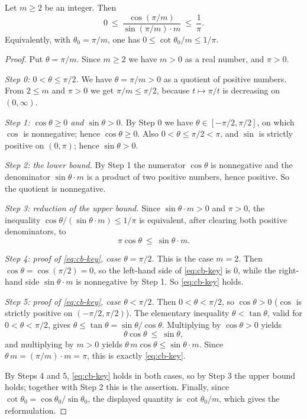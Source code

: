 \begin{lemma}
Let $m\ge2$ be an integer. Then
\[
  0\ \le\ \frac{\cos(\pi/m)}{\sin(\pi/m)\cdot m}\ \le\ \frac1\pi .
\]
Equivalently, with $\theta_0=\pi/m$, one has $0\le\cot\theta_0/m\le1/\pi$.
\end{lemma}
\begin{proof}
Put $\theta=\pi/m$. Since $m\ge2$ we have $m>0$ as a real number, and $\pi>0$.

\emph{Step 0: $0<\theta\le\pi/2$.} We have $\theta=\pi/m>0$ as a quotient of
positive numbers. From $2\le m$ and $\pi>0$ we get $\pi/m\le\pi/2$, because
$t\mapsto\pi/t$ is decreasing on $(0,\infty)$.

\emph{Step 1: $\cos\theta\ge0$ and $\sin\theta>0$.} By Step 0 we have
$\theta\in[-\pi/2,\pi/2]$, on which $\cos$ is nonnegative; hence
$\cos\theta\ge0$. Also $0<\theta\le\pi/2<\pi$, and $\sin$ is strictly positive
on $(0,\pi)$; hence $\sin\theta>0$.

\emph{Step 2: the lower bound.} By Step 1 the numerator $\cos\theta$ is
nonnegative and the denominator $\sin\theta\cdot m$ is a product of two positive
numbers, hence positive. So the quotient is nonnegative.

\emph{Step 3: reduction of the upper bound.} Since $\sin\theta\cdot m>0$ and
$\pi>0$, the inequality $\cos\theta/(\sin\theta\cdot m)\le1/\pi$ is equivalent,
after clearing both positive denominators, to
\begin{equation}\label{eq:cb-key}
  \pi\cos\theta\ \le\ \sin\theta\cdot m .
\end{equation}

\emph{Step 4: proof of \eqref{eq:cb-key}, case $\theta=\pi/2$.} This is the case
$m=2$. Then $\cos\theta=\cos(\pi/2)=0$, so the left-hand side of
\eqref{eq:cb-key} is $0$, while the right-hand side $\sin\theta\cdot m$ is
nonnegative by Step 1. So \eqref{eq:cb-key} holds.

\emph{Step 5: proof of \eqref{eq:cb-key}, case $\theta<\pi/2$.} Then
$0<\theta<\pi/2$, so $\cos\theta>0$ ($\cos$ is strictly positive on
$(-\pi/2,\pi/2)$). The elementary inequality $\theta<\tan\theta$, valid for
$0<\theta<\pi/2$, gives $\theta\le\tan\theta=\sin\theta/\cos\theta$. Multiplying
by $\cos\theta>0$ yields
\[
  \theta\cos\theta\ \le\ \sin\theta ,
\]
and multiplying by $m>0$ yields $\theta\,m\cos\theta\le\sin\theta\cdot m$. Since
$\theta\,m=(\pi/m)\cdot m=\pi$, this is exactly \eqref{eq:cb-key}.

By Steps 4 and 5, \eqref{eq:cb-key} holds in both cases, so by Step 3 the upper
bound holds; together with Step 2 this is the assertion. Finally, since
$\cot\theta_0=\cos\theta_0/\sin\theta_0$, the displayed quantity is
$\cot\theta_0/m$, which gives the reformulation.
\end{proof}
